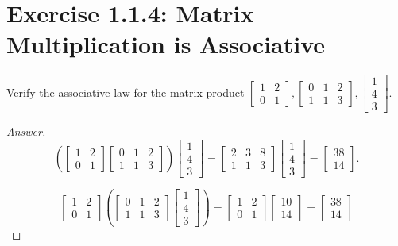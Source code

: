 \documentclass{amsbook}
\theoremstyle{definition}
\theoremstyle{remark}
\numberwithin{section}{chapter}
\numberwithin{equation}{chapter}
\begin{document}
\section{Exercise 1.1.4: Matrix Multiplication is Associative}

Verify the associative law for the matrix product $\begin{bmatrix}
1 & 2\\
0 & 1\end{bmatrix}, \begin{bmatrix}
0 & 1 & 2\\
1 & 1 & 3 \end{bmatrix}, \begin{bmatrix}
1\\
4\\
3\end{bmatrix}$.

\begin{proof}[Answer]

\[
\left(
\begin{bmatrix}
1 & 2\\
0 & 1\end{bmatrix} \begin{bmatrix}
0 & 1 & 2\\
1 & 1 & 3 \end{bmatrix}
\right)
\begin{bmatrix}
1\\
4\\
3\end{bmatrix}
=\begin{bmatrix}
     2     &3     &8\\
     1     &1     &3
\end{bmatrix}\begin{bmatrix}
1\\
4\\
3\end{bmatrix}=\begin{bmatrix}
38\\
14\end{bmatrix}.
\]

\[
\begin{bmatrix}
1 & 2\\
0 & 1\end{bmatrix}
\left(\begin{bmatrix}
0 & 1 & 2\\
1 & 1 & 3 \end{bmatrix}
\begin{bmatrix}
1\\
4\\
3\end{bmatrix}
\right)
=\begin{bmatrix}
1 &2\\
0 &1\end{bmatrix}\begin{bmatrix}
10\\
14\end{bmatrix}=\begin{bmatrix}
38\\
14\end{bmatrix}
\]
\end{proof}
\end{document}
